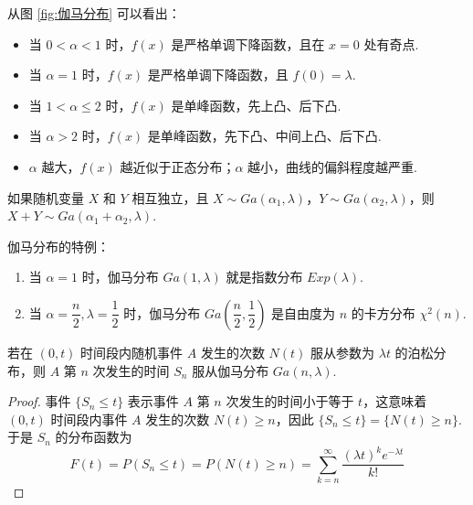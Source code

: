 从图 \ref{fig:伽马分布} 可以看出：
\begin{itemize}
    \item 当 $0 < \alpha < 1$ 时，$f(x)$ 是严格单调下降函数，且在 $x=0$ 处有奇点.
    \item 当 $\alpha = 1$ 时，$f(x)$ 是严格单调下降函数，且 $f(0) = \lambda$.
    \item 当 $1 < \alpha \leqslant 2$ 时，$f(x)$ 是单峰函数，先上凸、后下凸.
    \item 当 $\alpha > 2$ 时，$f(x)$ 是单峰函数，先下凸、中间上凸、后下凸.
    \item $\alpha$ 越大，$f(x)$ 越近似于正态分布；$\alpha$ 越小，曲线的偏斜程度越严重.
\end{itemize}

\begin{theorem}[][伽马分布的可加性]
    \indent 如果随机变量 $X$ 和 $Y$ 相互独立，且 $X \sim Ga(\alpha_1, \lambda)$，$Y \sim Ga(\alpha_2, \lambda)$，则 $X+Y \sim Ga(\alpha_1 + \alpha_2, \lambda)$.
\end{theorem}

伽马分布的特例：
\begin{enumerate}
    \item 当 $\alpha = 1$ 时，伽马分布 $Ga(1, \lambda)$ 就是指数分布 $Exp(\lambda)$.
    \item 当 $\alpha = \dfrac{n}{2}, \lambda = \dfrac{1}{2}$ 时，伽马分布 $Ga(\dfrac{n}{2}, \dfrac{1}{2})$ 是自由度为 $n$ 的卡方分布 $\chi^2(n)$.
\end{enumerate}

\begin{conclusion}[][泊松分布与伽马分布的关系]
    \indent 若在 $(0,t)$ 时间段内随机事件 $A$ 发生的次数 $N(t)$ 服从参数为 $\lambda t$ 的泊松分布，则 $A$ 第 $n$ 次发生的时间 $S_n$ 服从伽马分布 $Ga(n, \lambda)$.
\end{conclusion}

\begin{proof}
    事件 $\{ S_n \leqslant t \}$ 表示事件 $A$ 第 $n$ 次发生的时间小于等于 $t$，这意味着 $(0,t)$ 时间段内事件 $A$ 发生的次数 $N(t) \geqslant n$，因此 $\{ S_n \leqslant t \} = \{ N(t) \geqslant n \}$.于是 $S_n$ 的分布函数为
    $$
    F(t) = P(S_n \leqslant t) = P(N(t) \geqslant n) = \sum_{k=n}^{\infty} \dfrac{(\lambda t)^k e^{-\lambda t}}{k!}
    $$
\end{proof}


